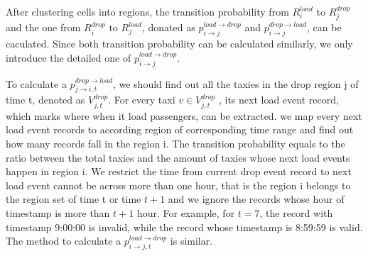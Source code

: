  After clustering cells into regions, the transition probability from $R_i^{load}$ to $R_j^{drop}$ and the one from $R_i^{drop}$ to $R_j^{load}$, donated as $p_{i\rightarrow j}^{load\rightarrow drop}$ and $p_{i\rightarrow j}^{drop\rightarrow load}$, can be caculated. Since both transition probability can be calculated similarly, we only introduce the detailed one of $p_{i\rightarrow j}^{load\rightarrow drop}$.

To calculate a $p^{drop\rightarrow load}_{j\rightarrow i,t}$, we should find out all the taxies in the drop region j of time t, denoted as $V^{drop}_{j,t}$. For every taxi $v \in V^{drop}_{j,t}$ , its next load event record, which marks where when it load passengers, can be extracted. 	we map every next load event records to according region of corresponding time range and find out how many records fall in the region i. The transition probability equals to the ratio between the total taxies  and the amount of taxies whose next load events happen in region i.
We restrict the time from current drop event record to next load event cannot be across more than one hour, that is the region i belongs to the region set of time t or time $t+1$ and we ignore the records whose hour of timestamp is more than $t+1$ hour. For example, for $t=7$,  the record with timestamp 9:00:00 is invalid, while the record whose timestamp is 8:59:59 is valid.
The method to calculate a $p^{load\rightarrow drop}_{i\rightarrow j,t}$  is similar. 
